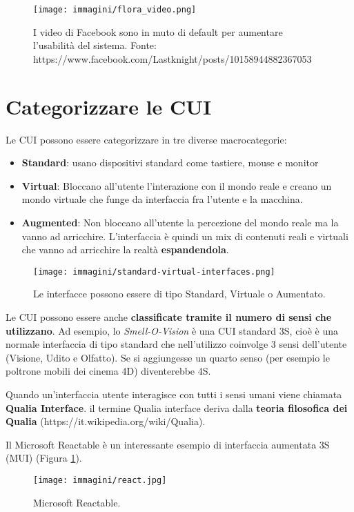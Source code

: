 
\begin{figure}[!h]
	\centering
	\texttt{[image: immagini/flora\_video.png]}
	\caption{I video di Facebook sono in muto di default per aumentare l'usabilità del sistema. Fonte: 
https://www.facebook.com/Lastknight/posts/10158944882367053}
\end{figure}



\section{Categorizzare le CUI}
Le CUI possono essere categorizzare in tre diverse macrocategorie:

\begin{itemize}
	\item \textbf{Standard}: usano dispositivi standard come tastiere, mouse e monitor
	\item \textbf{Virtual}: Bloccano all'utente l'interazione con il mondo reale e creano un mondo virtuale che funge da interfaccia fra l'utente e la macchina.
	\item \textbf{Augmented}: Non bloccano all'utente la percezione del mondo reale ma la vanno ad arricchire. L'interfaccia è quindi un mix di contenuti reali e virtuali che vanno ad arricchire la realtà \textbf{espandendola}.
\end{itemize}

\begin{figure}[!h]
	\centering
	\texttt{[image: immagini/standard-virtual-interfaces.png]}
	\caption{Le interfacce possono essere di tipo Standard, Virtuale o Aumentato.}
\end{figure}

Le CUI possono essere anche \textbf{classificate tramite il numero di sensi che utilizzano}. Ad esempio, lo \textit{Smell-O-Vision} è una CUI standard 3S, cioè è una normale interfaccia di tipo standard che nell'utilizzo coinvolge 3 sensi dell'utente (Visione, Udito e Olfatto). Se si aggiungesse un quarto senso (per esempio le poltrone mobili dei cinema 4D) diventerebbe 4S.

Quando un'interfaccia utente interagisce con tutti i sensi umani viene chiamata \textbf{Qualia Interface}. il termine Qualia interface deriva dalla \textbf{teoria filosofica dei Qualia} (https://it.wikipedia.org/wiki/Qualia).

Il Microsoft Reactable è un interessante esempio di interfaccia aumentata 3S (MUI) (Figura \ref{fig:react-table}).

\begin{figure}[!h]
	\centering
	\texttt{[image: immagini/react.jpg]}
	\caption{Microsoft Reactable.}
	\label{fig:react-table}
\end{figure}



\pagebreak

